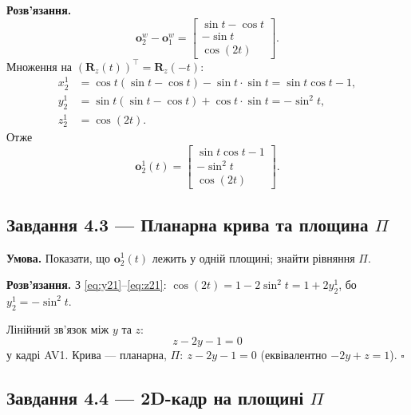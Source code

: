 \documentclass[11pt,a4paper]{article}
\begin{document}
\textbf{Розв'язання.}
\begin{equation}
  \bm{o}_2^w - \bm{o}_1^w =
  \begin{bmatrix}
    \sin t - \cos t \\
    -\sin t \\
    \cos(2t)
  \end{bmatrix}.
\end{equation}
Множення на $(\bm{R}_z(t))^\top = \bm{R}_z(-t)$:
\begin{align}
  x_2^1 &= \cos t(\sin t - \cos t) - \sin t \cdot \sin t
         = \sin t\cos t - 1, \label{eq:x21}\\
  y_2^1 &= \sin t(\sin t - \cos t) + \cos t \cdot \sin t
         = -\sin^2 t, \label{eq:y21}\\
  z_2^1 &= \cos(2t). \label{eq:z21}
\end{align}
Отже
\begin{equation}
  \boxed{
  \bm{o}_2^1(t) =
  \begin{bmatrix}
    \sin t\cos t - 1 \\
    -\sin^2 t \\
    \cos(2t)
  \end{bmatrix}
  }.
\end{equation}

\subsection{Завдання 4.3 --- Планарна крива та площина \texorpdfstring{$\Pi$}{Pi}}

\textbf{Умова.} Показати, що $\bm{o}_2^1(t)$ лежить у одній площині; знайти рівняння $\Pi$.

\textbf{Розв'язання.}
З \eqref{eq:y21}--\eqref{eq:z21}: $\cos(2t) = 1 - 2\sin^2 t = 1 + 2y_2^1$, бо $y_2^1 = -\sin^2 t$.

Лінійний зв'язок між $y$ та $z$:
\begin{equation}
  \boxed{z - 2y - 1 = 0}
\end{equation}
у кадрі AV1. Крива --- планарна, $\Pi:\ z - 2y - 1 = 0$ (еквівалентно $-2y + z = 1$). \hfill$\square$

\subsection{Завдання 4.4 --- 2D-кадр на площині \texorpdfstring{$\Pi$}{Pi}}
\end{document}
